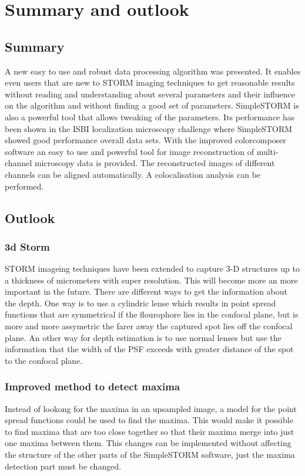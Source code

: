 \chapter{Summary and outlook}
\section{Summary}
A new easy to use and robust data processing algorithm was presented. It enables even users that are new to STORM imaging techniques to get reasonable results without reading and understanding about several parameters and their influence on the algorithm and without finding a good set of parameters.\newline
SimpleSTORM is also a powerful tool that allows tweaking of the parameters. Its performance has been shown in the ISBI localization microscopy challenge where SimpleSTORM showed good performance overall data sets.\newline
With the improved colorcomposer software an easy to use and powerful tool for image reconstruction of multi-channel microscopy data is provided. The reconstructed images of different channels can be aligned automatically. A colocalisation analysis can be performed.
\section{Outlook}
\subsection{3d Storm}
STORM imageing techniques have been extended to capture 3-D structures up to a thickness of micrometers with super resolution. This will become more an more important in the future. There are different ways to get the information about the depth. One way is to use a cylindric lense which results in point spread functions that are symmetrical if the flourophore lies in the confocal plane, but is more and more assymetric the farer away the captured spot lies off the confocal plane.\newline
An other way for depth estimation is to use normal lenses but use the information that the width of the PSF exceeds with greater distance of the spot to the confocal plane.
\subsection{Improved method to detect maxima}
Instead of lookong for the maxima in an upsampled image, a model for the point spread functions could be used to find the maxima. This would make it possible to find maxima that are too close together so that their maxima merge into just one maxima between them.\newline
This changes can be implemented without affecting the structure of the other parts of the SimpleSTORM software, just the maxima detection part must be changed.
